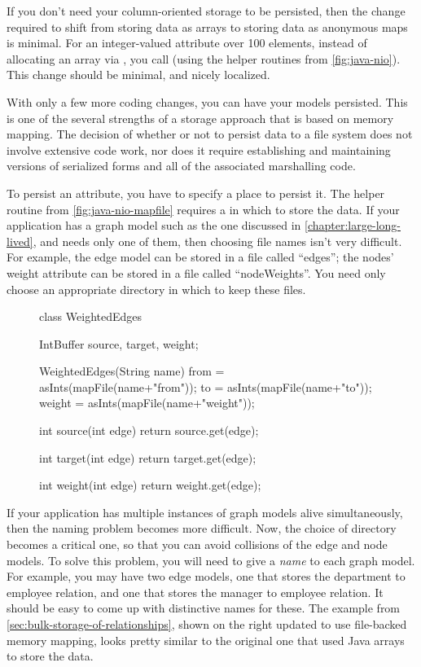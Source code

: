 If you don't need your column-oriented storage to be persisted, then the change
required to shift from storing data as arrays to storing data as anonymous maps
is minimal. For an integer-valued attribute over 100 elements, instead of
allocating an array via , you call
 (using the helper routines from
\autoref{fig:java-nio}). This change should be minimal, and nicely localized.

With only a few more coding changes, you can have your models persisted. This is
one of the several strengths of a storage approach that is based on
memory mapping. The decision of whether or not to persist data to a
file system does not involve extensive code work, nor does it require
establishing and maintaining versions of serialized forms and all of the
associated marshalling code.

To persist an attribute, you have to specify a place to persist it. The helper
routine  from \autoref{fig:java-nio-mapfile} requires a
 in which to store the data. If your application has a graph model
such as the one discussed in \autoref{chapter:large-long-lived}, and needs only
one of them, then choosing file names isn't very difficult. For example, the
edge model can be stored in a file called ``edges''; the nodes' weight attribute
can be stored in a file called ``nodeWeights''. You need only choose an
appropriate directory in which to keep these files.


\begin{figure}
\centering
\begin{framedlisting}
class WeightedEdges {
 IntBuffer source, target, weight;
  
 WeightedEdges(String name) {
   from = asInts(mapFile(name+"from"));
   to = asInts(mapFile(name+"to"));
   weight = asInts(mapFile(name+"weight"));
 }

 int source(int edge) {
   return source.get(edge);
 }
  
 int target(int edge) {
   return target.get(edge);
 }
  
 int weight(int edge) {
   return weight.get(edge);
 }
}  
\end{framedlisting}
\end{figure}

If your application has multiple instances of graph models alive simultaneously,
then the naming problem becomes more difficult. Now, the choice of directory
becomes a critical one, so that you can avoid collisions of the edge and node
models. To solve this problem, you will need to give a \emph{name} to each graph
model. For example, you may have two edge models, one that stores the department
to employee relation, and one that stores the manager to employee relation. It
should be easy to come up with distinctive names for these. The
  example from
\autoref{sec:bulk-storage-of-relationships}, shown on the right updated to use
file-backed memory mapping, looks pretty similar to the original one that used
Java arrays to store the data.

